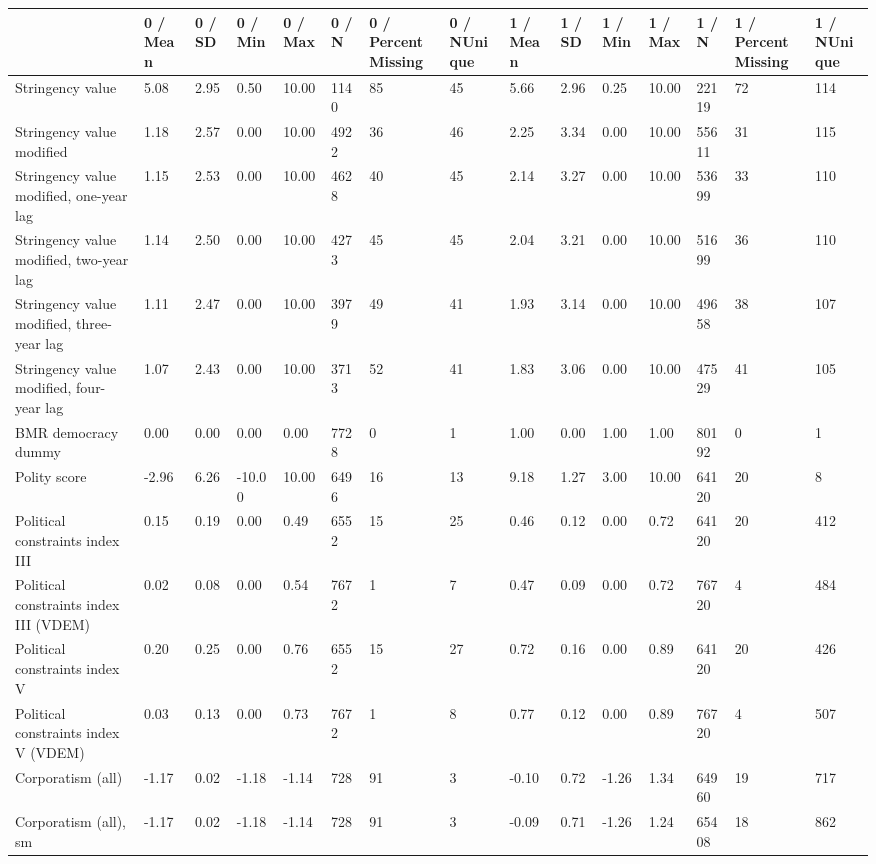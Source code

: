 
\begin{longtable}{lllllllllllllll}
\toprule
  & 0 / Mean & 0 / SD & 0 / Min & 0 / Max & 0 / N & 0 / PercentMissing & 0 / NUnique & 1 / Mean & 1 / SD & 1 / Min & 1 / Max & 1 / N & 1 / PercentMissing & 1 / NUnique\\
\midrule
Stringency value & 5.08 & 2.95 & 0.50 & 10.00 & 1140 & 85 & 45 & 5.66 & 2.96 & 0.25 & 10.00 & 22119 & 72 & 114\\
Stringency value modified & 1.18 & 2.57 & 0.00 & 10.00 & 4922 & 36 & 46 & 2.25 & 3.34 & 0.00 & 10.00 & 55611 & 31 & 115\\
Stringency value modified, one-year lag & 1.15 & 2.53 & 0.00 & 10.00 & 4628 & 40 & 45 & 2.14 & 3.27 & 0.00 & 10.00 & 53699 & 33 & 110\\
Stringency value modified, two-year lag & 1.14 & 2.50 & 0.00 & 10.00 & 4273 & 45 & 45 & 2.04 & 3.21 & 0.00 & 10.00 & 51699 & 36 & 110\\
Stringency value modified, three-year lag & 1.11 & 2.47 & 0.00 & 10.00 & 3979 & 49 & 41 & 1.93 & 3.14 & 0.00 & 10.00 & 49658 & 38 & 107\\
\addlinespace
Stringency value modified, four-year lag & 1.07 & 2.43 & 0.00 & 10.00 & 3713 & 52 & 41 & 1.83 & 3.06 & 0.00 & 10.00 & 47529 & 41 & 105\\
BMR democracy dummy & 0.00 & 0.00 & 0.00 & 0.00 & 7728 & 0 & 1 & 1.00 & 0.00 & 1.00 & 1.00 & 80192 & 0 & 1\\
Polity score & -2.96 & 6.26 & -10.00 & 10.00 & 6496 & 16 & 13 & 9.18 & 1.27 & 3.00 & 10.00 & 64120 & 20 & 8\\
Political constraints index III & 0.15 & 0.19 & 0.00 & 0.49 & 6552 & 15 & 25 & 0.46 & 0.12 & 0.00 & 0.72 & 64120 & 20 & 412\\
Political constraints index III (VDEM) & 0.02 & 0.08 & 0.00 & 0.54 & 7672 & 1 & 7 & 0.47 & 0.09 & 0.00 & 0.72 & 76720 & 4 & 484\\
\addlinespace
Political constraints index V & 0.20 & 0.25 & 0.00 & 0.76 & 6552 & 15 & 27 & 0.72 & 0.16 & 0.00 & 0.89 & 64120 & 20 & 426\\
Political constraints index V (VDEM) & 0.03 & 0.13 & 0.00 & 0.73 & 7672 & 1 & 8 & 0.77 & 0.12 & 0.00 & 0.89 & 76720 & 4 & 507\\
Corporatism (all) & -1.17 & 0.02 & -1.18 & -1.14 & 728 & 91 & 3 & -0.10 & 0.72 & -1.26 & 1.34 & 64960 & 19 & 717\\
Corporatism (all), sm & -1.17 & 0.02 & -1.18 & -1.14 & 728 & 91 & 3 & -0.09 & 0.71 & -1.26 & 1.24 & 65408 & 18 & 862\\

\end{longtable}
